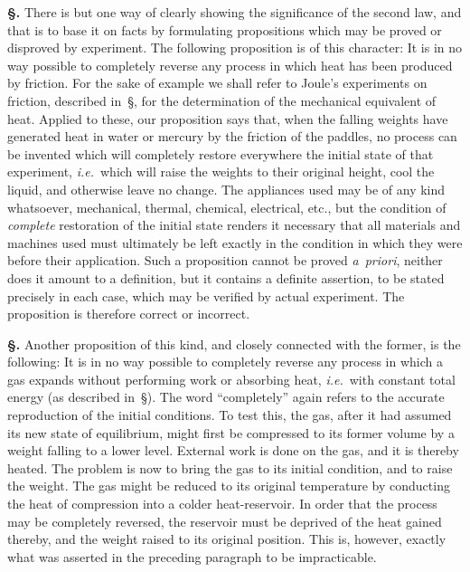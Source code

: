 \documentclass[12pt]{book}[2005/09/16]
\newcommand{\Section}[1]{
  \medskip\par\textbf{§\;#1}
  \label{section:#1}
}
\newcommand{\SecRef}[2][§\;]{\hyperref[section:#2.]{{\upshape #1#2}}}
\newcommand{\PageSep}[1]{\ignorespaces}
\newcommand{\ie}{\emph{i.e.}}
\begin{document}
\Section{109.} There is but one way of clearly showing the significance
of the second law, and that is to base it on facts
by formulating propositions which may be proved or disproved
by experiment. The following proposition is of this
character: It is in no way possible to completely reverse
any process in which heat has been produced by friction.
For the sake of example we shall refer to Joule's experiments
on friction, described in~\SecRef{60}, for the determination
of the mechanical equivalent of heat. Applied to these,
our proposition says that, when the falling weights have
generated heat in water or mercury by the friction of the
paddles, no process can be invented which will completely
restore everywhere the initial state of that experiment, \ie\
which will raise the weights to their original height, cool
the liquid, and otherwise leave no change. The appliances
used may be of any kind whatsoever, mechanical, thermal,
chemical, electrical, etc., but the condition of \emph{complete}
restoration of the initial state renders it necessary that all
materials and machines used must ultimately be left exactly
in the condition in which they were before their application.
Such a proposition cannot be proved \textit{a~priori}, neither does
it amount to a definition, but it contains a definite assertion,
to be stated precisely in each case, which may be
verified by actual experiment. The proposition is therefore
correct or incorrect.

\Section{110.} Another proposition of this kind, and closely
connected with the former, is the following: It is in no
way possible to completely reverse any process in which a
gas expands without performing work or absorbing heat,
\ie\ with constant total energy (as described in~\SecRef{68}). The
word ``completely'' again refers to the accurate reproduction
of the initial conditions. To test this, the gas, after
\PageSep{82}
it had assumed its new state of equilibrium, might first be
compressed to its former volume by a weight falling to a
lower level. External work is done on the gas, and it is
thereby heated. The problem is now to bring the gas to
its initial condition, and to raise the weight. The gas might
be reduced to its original temperature by conducting the
heat of compression into a colder heat-reservoir. In order
that the process may be completely reversed, the reservoir
must be deprived of the heat gained thereby, and the weight
raised to its original position. This is, however, exactly
what was asserted in the preceding paragraph to be impracticable.
\end{document}
